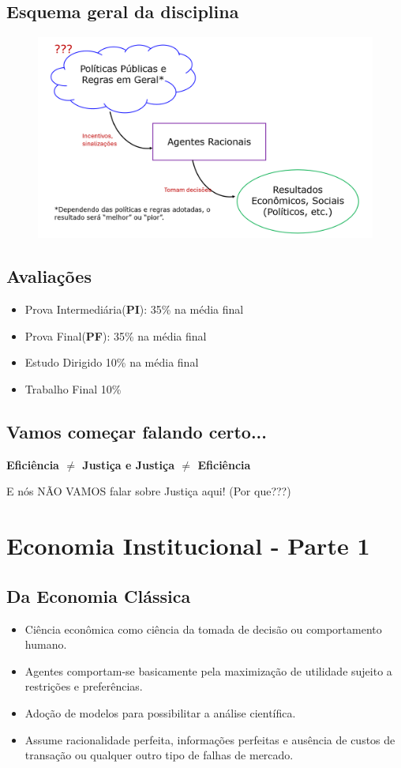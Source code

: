 \documentclass[a4paper,12pt]{article}[abntex2]
\begin{document}
\subsection{\textbf{Esquema geral da disciplina}}
\begin{figure}[H]
    \centering
    \includegraphics[width=0.75\linewidth]{Imagens/a1i2.png}
\end{figure}

\subsection{\textbf{Avaliações}}
\begin{itemize}
    \item Prova Intermediária(\textbf{PI}): 35\% na média final
    \item Prova Final(\textbf{PF}): 35\% na média final
    \item Estudo Dirigido 10\% na média final
    \item Trabalho Final 10\%
\end{itemize}

\subsection{\textbf{Vamos começar falando certo...}}
\textbf{Eficiência $\neq$ Justiça e Justiça $\neq$ Eficiência}

E nós NÃO VAMOS falar sobre Justiça aqui! (Por que???)

\section{\textbf{Economia Institucional - Parte 1}}
\subsection{\textbf{Da Economia Clássica}}
\begin{itemize}
    \item Ciência econômica como ciência da tomada de decisão ou comportamento humano.
    \item Agentes comportam-se basicamente pela maximização de utilidade sujeito a restrições e preferências. 
    \item Adoção de modelos para possibilitar a análise científica. 
    \item Assume racionalidade perfeita, informações perfeitas e ausência de custos de transação ou qualquer outro tipo de falhas de mercado.  
\end{itemize}
\end{document}
